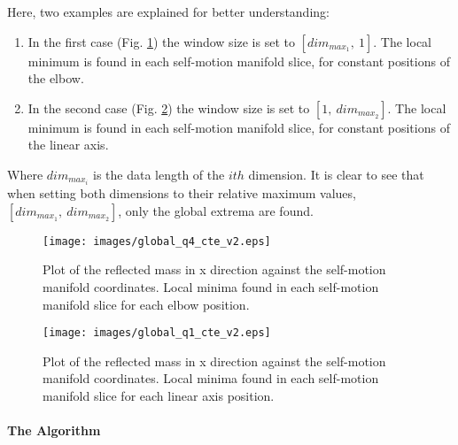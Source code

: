 Here, two examples are explained for better understanding:
\begin{enumerate}
	\item In the first case (Fig. \ref{fig:maxminfilter1}) the window size is set to $[dim_{max_{1}}, \ 1]$. The local minimum is found in each self-motion manifold slice, for constant positions of the elbow.
	\item In the second case (Fig. \ref{fig:maxminfilter2}) the window size is set to $[1, \ dim_{max_{2}}]$. The local minimum is found in each self-motion manifold slice, for constant positions of the linear axis.
	
\end{enumerate}

Where $dim_{max_{i}}$ is the data length of the $ith$ dimension. It is clear to see that when setting both dimensions to their relative maximum values, $[dim_{max_{1}}, \ dim_{max_{2}}]$, only the global extrema are found.


\begin{figure}[htb]
	\centerline{
		\texttt{[image: images/global\_q4\_cte\_v2.eps]}}
	\caption{Plot of the reflected mass in x direction against the self-motion
		manifold coordinates. Local minima found in each self-motion manifold slice for each elbow position. }
	\label{fig:maxminfilter1}
\end{figure}

\begin{figure}[htb]
	\centerline{
 		\texttt{[image: images/global\_q1\_cte\_v2.eps]}}
	\caption{ Plot of the reflected mass in x direction against the self-motion
		manifold coordinates. Local minima found in each self-motion manifold slice for each linear axis position. }
	\label{fig:maxminfilter2}
\end{figure}





\paragraph{The Algorithm}
\label{subsec:global_alg}

